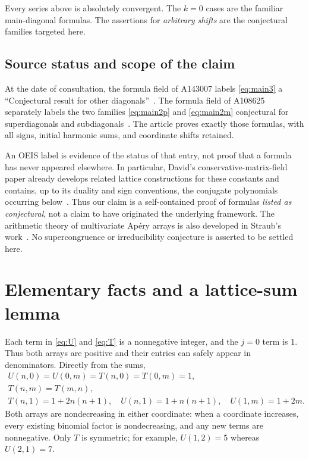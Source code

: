 \documentclass[11pt]{article}
\numberwithin{equation}{section}
\theoremstyle{definition}
\theoremstyle{remark}
\newcommand{\Apery}{Ap\'ery}
\begin{document}
Every series above is absolutely convergent. The $k=0$ cases are the familiar
main-diagonal formulas. The assertions for \emph{arbitrary shifts} are the
conjectural families targeted here.

\subsection{Source status and scope of the claim}
At the date of consultation, the formula field of A143007 labels
\eqref{eq:main3} a ``Conjectural result for other diagonals''~\cite{oeisT}.
The formula field of A108625 separately labels the two families
\eqref{eq:main2p} and \eqref{eq:main2m} conjectural for superdiagonals and
subdiagonals~\cite{oeisU}. The article proves exactly those formulas, with
all signs, initial harmonic sums, and coordinate shifts retained.

An OEIS label is evidence of the status of that entry, not proof that a
formula has never appeared elsewhere. In particular, David's
conservative-matrix-field paper already develops related lattice
constructions for these constants and contains, up to its duality and sign conventions, the conjugate
polynomials occurring below~\cite[Examples 16, 19, 25; Section 5]{david}.
Thus our claim is a self-contained proof of formulas \emph{listed as
conjectural}, not a claim to have originated the underlying framework.
The arithmetic theory of multivariate \Apery{} arrays is also developed
in Straub's work~\cite{straub}. No supercongruence or irreducibility
conjecture is asserted to be settled here.

\section{Elementary facts and a lattice-sum lemma}\label{sec:lattice}

Each term in \eqref{eq:U} and \eqref{eq:T} is a nonnegative integer, and the
$j=0$ term is $1$. Thus both arrays are positive and their entries can safely
appear in denominators. Directly from the sums,
\begin{gather}
 U(n,0)=U(0,m)=T(n,0)=T(0,m)=1,\label{eq:axes}\\
 T(n,m)=T(m,n),\label{eq:symmetry}\\
 T(n,1)=1+2n(n+1),\quad
 U(n,1)=1+n(n+1),\quad U(1,m)=1+2m.\label{eq:firstrow}
\end{gather}
Both arrays are nondecreasing in either coordinate: when a coordinate
increases, every existing binomial factor is nondecreasing, and any
new terms are nonnegative. Only $T$ is symmetric; for example,
$U(1,2)=5$ whereas $U(2,1)=7$.
\end{document}
